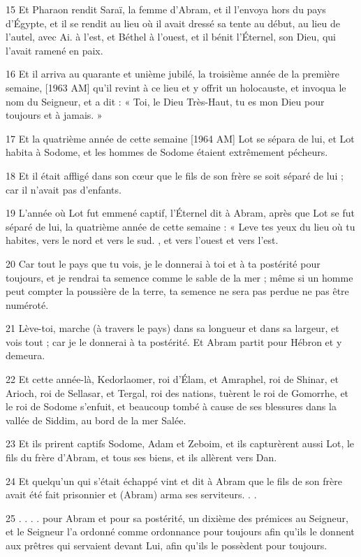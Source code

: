 \par 15 Et Pharaon rendit Saraï, la femme d'Abram, et il l'envoya hors du pays d'Égypte, et il se rendit au lieu où il avait dressé sa tente au début, au lieu de l'autel, avec Ai. à l'est, et Béthel à l'ouest, et il bénit l'Éternel, son Dieu, qui l'avait ramené en paix.
\par 16 Et il arriva au quarante et unième jubilé, la troisième année de la première semaine, [1963 AM] qu'il revint à ce lieu et y offrit un holocauste, et invoqua le nom du Seigneur, et a dit : « Toi, le Dieu Très-Haut, tu es mon Dieu pour toujours et à jamais. »
\par 17 Et la quatrième année de cette semaine [1964 AM] Lot se sépara de lui, et Lot habita à Sodome, et les hommes de Sodome étaient extrêmement pécheurs.
\par 18 Et il était affligé dans son cœur que le fils de son frère se soit séparé de lui ; car il n'avait pas d'enfants.
\par 19 L'année où Lot fut emmené captif, l'Éternel dit à Abram, après que Lot se fut séparé de lui, la quatrième année de cette semaine : « Leve tes yeux du lieu où tu habites, vers le nord et vers le sud. , et vers l’ouest et vers l’est.
\par 20 Car tout le pays que tu vois, je le donnerai à toi et à ta postérité pour toujours, et je rendrai ta semence comme le sable de la mer ; même si un homme peut compter la poussière de la terre, ta semence ne sera pas perdue ne pas être numéroté.
\par 21 Lève-toi, marche (à travers le pays) dans sa longueur et dans sa largeur, et vois tout ; car je le donnerai à ta postérité. Et Abram partit pour Hébron et y demeura.
\par 22 Et cette année-là, Kedorlaomer, roi d'Élam, et Amraphel, roi de Shinar, et Arioch, roi de Sellasar, et Tergal, roi des nations, tuèrent le roi de Gomorrhe, et le roi de Sodome s'enfuit, et beaucoup tombé à cause de ses blessures dans la vallée de Siddim, au bord de la mer Salée.
\par 23 Et ils prirent captifs Sodome, Adam et Zeboim, et ils capturèrent aussi Lot, le fils du frère d'Abram, et tous ses biens, et ils allèrent vers Dan.
\par 24 Et quelqu'un qui s'était échappé vint et dit à Abram que le fils de son frère avait été fait prisonnier et (Abram) arma ses serviteurs. . .
\par 25 . . . . pour Abram et pour sa postérité, un dixième des prémices au Seigneur, et le Seigneur l'a ordonné comme ordonnance pour toujours afin qu'ils le donnent aux prêtres qui servaient devant Lui, afin qu'ils le possèdent pour toujours.
